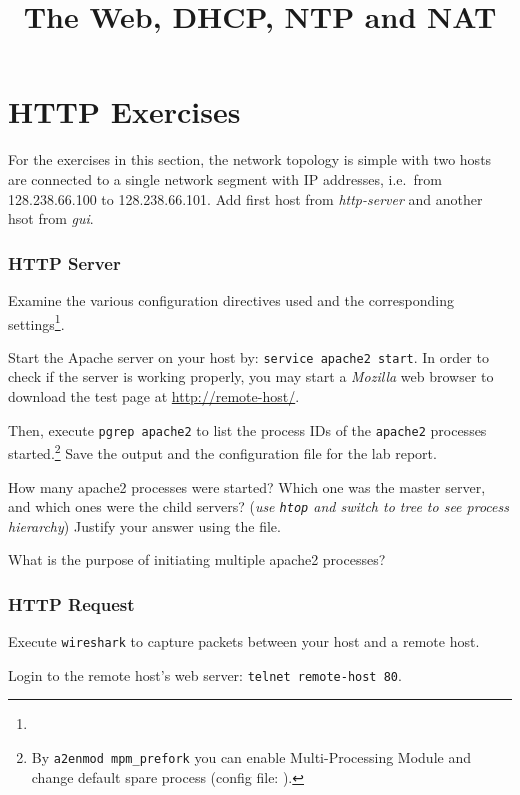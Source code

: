 \documentclass{../UTNetLab}
\title{The Web, DHCP, NTP and NAT}
\begin{document}
\part{HTTP Exercises}
    For the exercises in this section, the network topology is simple with two hosts are connected to a single network segment with IP addresses, i.e.\  from 128.238.66.100 to 128.238.66.101. Add first host from \textit{http-server} and another hsot from \textit{gui}.

\section{HTTP Server}
    Examine the various configuration directives used and the corresponding settings\footnote{}. 

    Start the Apache server on your host by: \lstinline{service apache2 start}.
    In order to check if the server is working properly, you may start a \textit{Mozilla} web browser to download the test page at \url{http://remote-host/}.

    Then, execute \lstinline{pgrep apache2} to list the process IDs of the \lstinline{apache2} processes started.\footnote{By \lstinline{a2enmod mpm_prefork} you can enable Multi-Processing Module and change default spare process (config file: ).}
    Save the output and the configuration file for the lab report.
    
    \begin{report}
    \item How many apache2 processes were started?
    Which one was the master server, and which ones were the child servers? (\textit{use \lstinline{htop} and switch to \textit{tree} to see process hierarchy})
    Justify your answer using the  file.
    
    \item What is the purpose of initiating multiple apache2 processes?
    \end{report}

\section{HTTP Request}
    Execute \lstinline{wireshark} to capture packets between your host and a remote host. 

    Login to the remote host’s web server: \lstinline[emph={your-host, remote-host}]{telnet remote-host 80}. 
\end{document}
